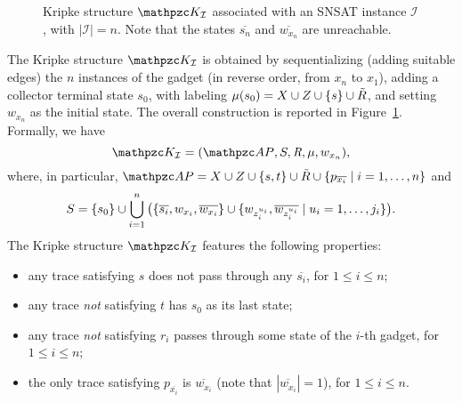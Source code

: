 \begin{figure}[p]
  \caption{Kripke structure $\Ku_\mathcal{I}$ associated with an SNSAT instance $\mathcal{I}$, with $|\mathcal{I}|=n$. Note that the states $\overline{s_n}$ and $\overline{w_{x_n}}$ are unreachable.}\label{fullKripke}
\end{figure}

The Kripke structure  $\Ku_\mathcal{I}$ is obtained by sequentializing (adding suitable edges) the $n$ instances of the gadget (in reverse order, from $x_n$ to $x_1$), adding a collector terminal state $s_0$, with labeling $\mu(s_0)=X \cup Z \cup \{s\} \cup \tilde{R}$, and setting $w_{x_n}$ as the initial state. The overall construction is reported in Figure~\ref{fullKripke}. Formally, we have \[\Ku_\mathcal{I}=(\Prop, \States,\Edges,\Lab,w_{x_n}),\] 
where, in particular, $\Prop=X \cup Z \cup \{s,t\} \cup \tilde{R}\cup\{p_{\overline{x_i}}\mid i=1,\ldots ,n\}$ and \[S=\{s_0\}\cup\bigcup_{i=1}^n\big(\{\overline{s_i},w_{x_i},\overline{w_{x_i}}\}\cup\{w_{z_i^{u_i}},\overline{w_{z_i^{u_i}}}\mid u_i=1,\ldots,j_i\}\big).\]
%
The Kripke structure $\Ku_\mathcal{I}$ features the following properties:
\begin{itemize}
	\item any trace satisfying $s$ does not pass through any $\overline{s_i}$, for $1\leq i\leq n$;
	\item any trace \emph{not} satisfying $t$ has $s_0$ as its last state;
	\item any trace \emph{not} satisfying $r_i$ passes through some state of the $i$-th gadget, for $1\leq i\leq n$;
	\item the only trace satisfying $p_{\overline{x_i}}$ is $\overline{w_{x_i}}$ (note that $|\overline{w_{x_i}}|=1$), for $1\leq i\leq n$.
\end{itemize}

